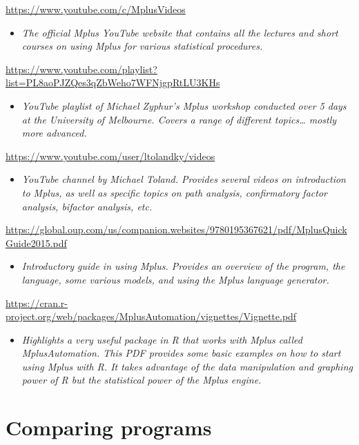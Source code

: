 \documentclass[
]{book}
\providecommand{\tightlist}{%
  \setlength{\itemsep}{0pt}\setlength{\parskip}{0pt}}
\begin{document}
\url{https://www.youtube.com/c/MplusVideos}

\begin{itemize}
\tightlist
\item
  \emph{The official Mplus YouTube website that contains all the lectures and short courses on using Mplus for various statistical procedures.}
\end{itemize}

\url{https://www.youtube.com/playlist?list=PL8aoPJZQes3qZbWeho7WFNjgpRtLU3KHs}

\begin{itemize}
\tightlist
\item
  \emph{YouTube playlist of Michael Zyphur's Mplus workshop conducted over 5 days at the University of Melbourne. Covers a range of different topics\ldots{} mostly more advanced.}
\end{itemize}

\url{https://www.youtube.com/user/ltolandky/videos}

\begin{itemize}
\tightlist
\item
  \emph{YouTube channel by Michael Toland. Provides several videos on introduction to Mplus, as well as specific topics on path analysis, confirmatory factor analysis, bifactor analysis, etc.}
\end{itemize}

\url{https://global.oup.com/us/companion.websites/9780195367621/pdf/MplusQuickGuide2015.pdf}

\begin{itemize}
\tightlist
\item
  \emph{Introductory guide in using Mplus. Provides an overview of the program, the language, some various models, and using the Mplus language generator.}
\end{itemize}

\url{https://cran.r-project.org/web/packages/MplusAutomation/vignettes/Vignette.pdf}

\begin{itemize}
\tightlist
\item
  \emph{Highlights a very useful package in R that works with Mplus called MplusAutomation. This PDF provides some basic examples on how to start using Mplus with R. It takes advantage of the data manipulation and graphing power of R but the statistical power of the Mplus engine.}
\end{itemize}

\section{Comparing programs}\label{comparing-programs}
\end{document}
